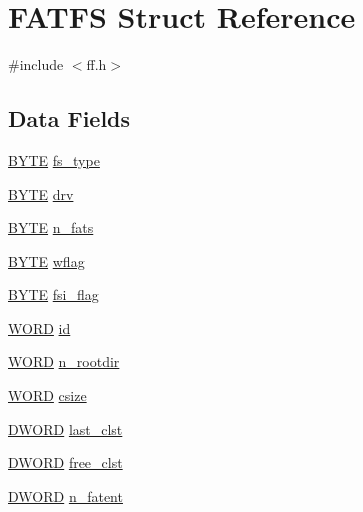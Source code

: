 \hypertarget{structFATFS}{}\section{F\+A\+T\+FS Struct Reference}
\label{structFATFS}


{\ttfamily \#include $<$ff.\+h$>$}

\subsection*{Data Fields}
\begin{DoxyCompactItemize}
\item 
\hyperlink{lz4_8c_a4ae1dab0fb4b072a66584546209e7d58}{B\+Y\+TE} \hyperlink{structFATFS_add27d97babe807b573eac98a71dc4ae5}{fs\+\_\+type}
\item 
\hyperlink{lz4_8c_a4ae1dab0fb4b072a66584546209e7d58}{B\+Y\+TE} \hyperlink{structFATFS_a6a791560e2687e8b1569bfce61208d2d}{drv}
\item 
\hyperlink{lz4_8c_a4ae1dab0fb4b072a66584546209e7d58}{B\+Y\+TE} \hyperlink{structFATFS_a56716c7e7ac10cf46e73ffb2a2e9b545}{n\+\_\+fats}
\item 
\hyperlink{lz4_8c_a4ae1dab0fb4b072a66584546209e7d58}{B\+Y\+TE} \hyperlink{structFATFS_a647e43c9ccae94b7274793d1909897de}{wflag}
\item 
\hyperlink{lz4_8c_a4ae1dab0fb4b072a66584546209e7d58}{B\+Y\+TE} \hyperlink{structFATFS_a84e9cdc5a6a8e33ea7ec192058abf161}{fsi\+\_\+flag}
\item 
\hyperlink{integer_8h_a197942eefa7db30960ae396d68339b97}{W\+O\+RD} \hyperlink{structFATFS_a417095d7c20d56d417dc0998e0dd5a5c}{id}
\item 
\hyperlink{integer_8h_a197942eefa7db30960ae396d68339b97}{W\+O\+RD} \hyperlink{structFATFS_a189a00aa038044ffad0fc7f7dcf2aae1}{n\+\_\+rootdir}
\item 
\hyperlink{integer_8h_a197942eefa7db30960ae396d68339b97}{W\+O\+RD} \hyperlink{structFATFS_ad7fa7a509f8d097a9ab182d6c47be568}{csize}
\item 
\hyperlink{integer_8h_ad342ac907eb044443153a22f964bf0af}{D\+W\+O\+RD} \hyperlink{structFATFS_ac26e848817569fedc15a9a4e49ddedd1}{last\+\_\+clst}
\item 
\hyperlink{integer_8h_ad342ac907eb044443153a22f964bf0af}{D\+W\+O\+RD} \hyperlink{structFATFS_ac834248773bf338df807f0d7e6b6a579}{free\+\_\+clst}
\item 
\hyperlink{integer_8h_ad342ac907eb044443153a22f964bf0af}{D\+W\+O\+RD} \hyperlink{structFATFS_a8da50eeba6469bc20d60ca0cf9a1307c}{n\+\_\+fatent}

\end{DoxyCompactItemize}
